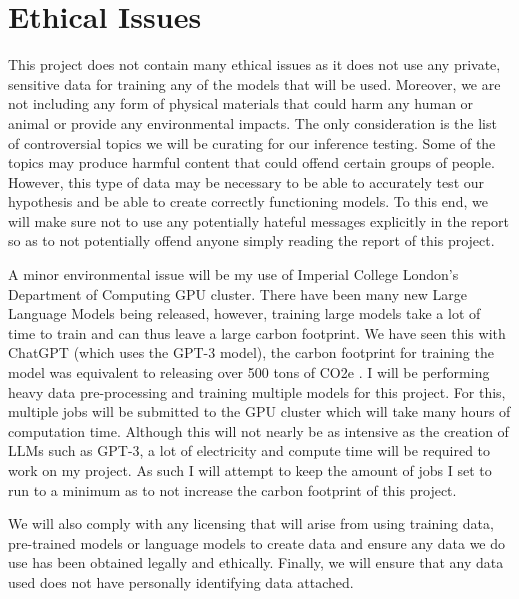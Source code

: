 \chapter{Ethical Issues}

This project does not contain many ethical issues as it does not use any private, sensitive data for training any of the models that will be used. Moreover, we are not including any form of physical materials that could harm any human or animal or provide any environmental impacts. The only consideration is the list of controversial topics we will be curating for our inference testing. Some of the topics may produce harmful content that could offend certain groups of people. However, this type of data may be necessary to be able to accurately test our hypothesis and be able to create correctly functioning models. To this end, we will make sure not to use any potentially hateful messages explicitly in the report so as to not potentially offend anyone simply reading the report of this project.

A minor environmental issue will be my use of Imperial College London's Department of Computing GPU cluster. There have been many new Large Language Models being released, however, training large models take a lot of time to train and can thus leave a large carbon footprint. We have seen this with ChatGPT (which uses the GPT-3 model), the carbon footprint for training the model was equivalent to releasing over 500 tons of CO2e \cite{chat_gpt_environment}. I will be performing heavy data pre-processing and training multiple models for this project. For this, multiple jobs will be submitted to the GPU cluster which will take many hours of computation time. Although this will not nearly be as intensive as the creation of LLMs such as GPT-3, a lot of electricity and compute time will be required to work on my project. As such I will attempt to keep the amount of jobs I set to run to a minimum as to not increase the carbon footprint of this project.

We will also comply with any licensing that will arise from using training data, pre-trained models or language models to create data and ensure any data we do use has been obtained legally and ethically. Finally, we will ensure that any data used does not have personally identifying data attached.